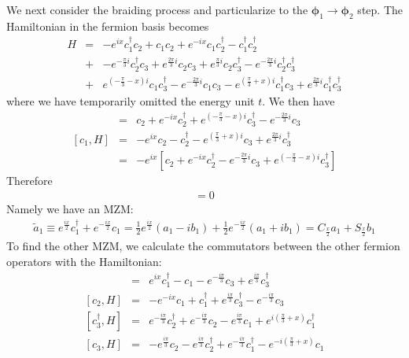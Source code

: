 \documentclass[aps,physrev,amsmath,amssymb]{revtex4-2}
\begin{document}
We next consider the braiding process and particularize to the $\boldsymbol{\phi}_1\rightarrow \boldsymbol{\phi}_2$ step. The Hamiltonian in the fermion basis becomes
\begin{eqnarray}
H &=& - e^{ix}c_1^\dag c_2 + c_1 c_2 + e^{-ix}c_1 c_2^\dag - c_1^\dag c_2^\dag \\\nonumber
&+&  - e^{-\frac{\pi}{3}i} c_2^\dag c_3 + e^{\frac{2\pi}{3}i} c_2 c_3 + e^{\frac{\pi}{3}i}c_2 c_3^\dag - e^{-\frac{2\pi}{3}i} c_2^\dag c_3^\dag \\\nonumber
&+&  e^{\left(-\frac{\pi}{3}-x\right)i} c_1 c_3^\dag  - e^{-\frac{2\pi}{3}i} c_1 c_3  - e^{\left(\frac{\pi}{3}+x\right)i} c_1^\dag c_3  + e^{\frac{2\pi}{3}i}  c_1^\dag c_3^\dag
\end{eqnarray}
where we have temporarily omitted the energy unit $t$. We then have
\begin{eqnarray}
	[c_1^\dag, H] &=& c_2 + e^{-ix} c_2^\dag + e^{\left(-\frac{\pi}{3}-x\right)i} c_3^\dag - e^{-\frac{2\pi}{3}i} c_3 \\\nonumber
	[c_1, H] &=& -e^{ix}c_2 - c_2^\dag - e^{\left(\frac{\pi}{3}+x\right)i} c_3 + e^{\frac{2\pi}{3}i} c_3^\dag\\\nonumber
	&=& -e^{ix} \left[ c_2 + e^{-i x}c_2^\dag - e^{-\frac{2\pi}{3}i} c_3 +  e^{\left(-\frac{\pi}{3}-x\right)i} c_3^\dag \right]
\end{eqnarray}
Therefore
\begin{eqnarray}
	[e^{\frac{ix}{2}}c_1^\dag + e^{-\frac{ix}{2}} c_1, H] = 0
\end{eqnarray}
Namely we have an MZM:
\begin{eqnarray}
	\tilde{a}_1 \equiv e^{\frac{ix}{2}}c_1^\dag + e^{-\frac{ix}{2}} c_1 = \frac{1}{2}e^{\frac{ix}{2}} (a_1 - ib_1) + \frac{1}{2}e^{-\frac{ix}{2}} (a_1 + ib_1) = C_{\frac{x}{2}} a_1 + S_{\frac{x}{2}} b_1
\end{eqnarray}
To find the other MZM, we calculate the commutators between the other fermion operators with the Hamiltonian:
\begin{eqnarray}
	[c_2^\dag, H] &=& e^{ix} c_1^\dag - c_1 - e^{-\frac{i\pi}{3}} c_3 + e^{\frac{i\pi}{3}} c_3^\dag \\\nonumber
	[c_2, H] &=& -e^{-ix} c_1 + c_1^\dag + e^{\frac{i\pi}{3}} c_3^\dag - e^{-\frac{i\pi}{3}} c_3\\\nonumber
	[c_3^\dag, H] &=& e^{-\frac{i\pi}{3}}c_2^\dag + e^{-\frac{i\pi}{3}} c_2 - e^{\frac{i\pi}{3}} c_1 + e^{i\left(\frac{\pi}{3} + x \right)}c_1^\dag \\\nonumber
	[c_3, H]	&=& -e^{\frac{i\pi}{3}}c_2 - e^{\frac{i\pi}{3}} c_2^\dag + e^{-\frac{i\pi}{3}} c_1^\dag - e^{-i\left(\frac{\pi}{3} + x \right)}c_1
\end{eqnarray}
\end{document}
